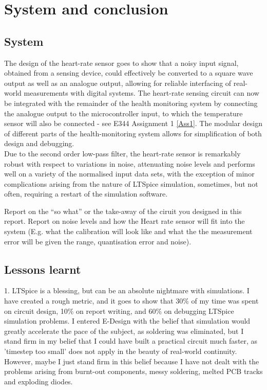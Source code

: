 \chapter{System and conclusion}
\vspace{-5mm}
\section{System}

The design of the heart-rate sensor goes to show that a noisy input signal, obtained from a sensing device, could effectively be converted to a square wave output as well as an analogue output, allowing for reliable interfacing of real-world measurements with digital systems. The heart-rate sensing circuit can now be integrated with the remainder of the health monitoring system by connecting the analogue output to the microcontroller input, to which the temperature sensor will also be connected - see E344 Assignment 1 \ref{Ass1}. The modular design of different parts of the health-monitoring system allows for simplification of both design and debugging.\\

Due to the second order low-pass filter, the heart-rate sensor is remarkably robust with respect to variations in noise, attenuating noise levels and performs well on a variety of the normalised input data sets, with the exception of minor complications arising from the nature of LTSpice simulation, sometimes, but not often, requiring a restart of the simulation software.


Report on the ``so what'' or the take-away of the ciruit you designed in this report.  
Report on noise levels and how the Heart rate sensor will fit into the system (E.g. what the calibration will look like and what the the measurement error will be given the range, quantisation error and noise). 

\section{Lessons learnt}
1. LTSpice is a blessing, but can be an absolute nightmare with simulations. I have created a rough metric, and it goes to show that 30\% of my time was spent on circuit design, 10\% on report writing, and 60\% on debugging LTSpice simulation problems. I entered E-Design with the belief that simulation would greatly accelerate the pace of the subject, as soldering was eliminated, but I stand firm in my belief that I could have built a practical circuit much faster, as 'timestep too small' does not apply in the beauty of real-world continuity. However, maybe I just stand firm in this belief because I have not dealt with the problems arising from burnt-out components, messy soldering, melted PCB tracks and exploding diodes.

